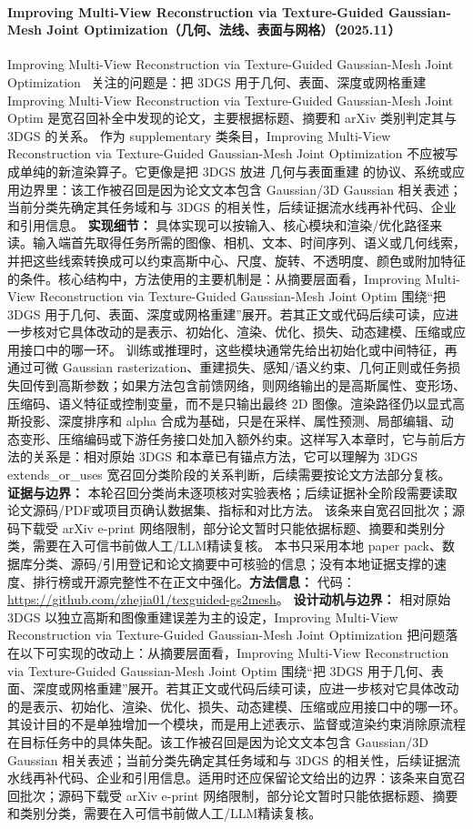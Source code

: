 \paragraph{Improving Multi-View Reconstruction via Texture-Guided Gaussian-Mesh Joint Optimization（几何、法线、表面与网格）（2025.11）}
Improving Multi-View Reconstruction via Texture-Guided Gaussian-Mesh Joint Optimization~\cite{2511_03950} 关注的问题是：把 3DGS 用于几何、表面、深度或网格重建 Improving Multi-View Reconstruction via Texture-Guided Gaussian-Mesh Joint Optim 是宽召回补全中发现的论文，主要根据标题、摘要和 arXiv 类别判定其与 3DGS 的关系。
作为 supplementary 类条目，Improving Multi-View Reconstruction via Texture-Guided Gaussian-Mesh Joint Optimization 不应被写成单纯的新渲染算子。它更像是把 3DGS 放进 几何与表面重建 的协议、系统或应用边界里：该工作被召回是因为论文文本包含 Gaussian/3D Gaussian 相关表述；当前分类先确定其任务域和与 3DGS 的相关性，后续证据流水线再补代码、企业和引用信息。
\textbf{实现细节：} 具体实现可以按输入、核心模块和渲染/优化路径来读。输入端首先取得任务所需的图像、相机、文本、时间序列、语义或几何线索，并把这些线索转换成可以约束高斯中心、尺度、旋转、不透明度、颜色或附加特征的条件。核心结构中，方法使用的主要机制是：从摘要层面看，Improving Multi-View Reconstruction via Texture-Guided Gaussian-Mesh Joint Optim 围绕“把 3DGS 用于几何、表面、深度或网格重建”展开。若其正文或代码后续可读，应进一步核对它具体改动的是表示、初始化、渲染、优化、损失、动态建模、压缩或应用接口中的哪一环。 训练或推理时，这些模块通常先给出初始化或中间特征，再通过可微 Gaussian rasterization、重建损失、感知/语义约束、几何正则或任务损失回传到高斯参数；如果方法包含前馈网络，则网络输出的是高斯属性、变形场、压缩码、语义特征或控制变量，而不是只输出最终 2D 图像。渲染路径仍以显式高斯投影、深度排序和 alpha 合成为基础，只是在采样、属性预测、局部编辑、动态变形、压缩编码或下游任务接口处加入额外约束。这样写入本章时，它与前后方法的关系是：相对原始 3DGS 和本章已有锚点方法，它可以理解为 3DGS extends\_or\_uses 宽召回分类阶段的关系判断，后续需要按论文方法部分复核。
\textbf{证据与边界：} 本轮召回分类尚未逐项核对实验表格；后续证据补全阶段需要读取论文源码/PDF或项目页确认数据集、指标和对比方法。 该条来自宽召回批次；源码下载受 arXiv e-print 网络限制，部分论文暂时只能依据标题、摘要和类别分类，需要在入可信书前做人工/LLM精读复核。 本书只采用本地 paper pack、数据库分类、源码/引用登记和论文摘要中可核验的信息；没有本地证据支撑的速度、排行榜或开源完整性不在正文中强化。\textbf{方法信息：} 代码：\url{https://github.com/zhejia01/texguided-gs2mesh}。
\textbf{设计动机与边界：} 相对原始 3DGS 以独立高斯和图像重建误差为主的设定，Improving Multi-View Reconstruction via Texture-Guided Gaussian-Mesh Joint Optimization 把问题落在以下可实现的改动上：从摘要层面看，Improving Multi-View Reconstruction via Texture-Guided Gaussian-Mesh Joint Optim 围绕“把 3DGS 用于几何、表面、深度或网格重建”展开。若其正文或代码后续可读，应进一步核对它具体改动的是表示、初始化、渲染、优化、损失、动态建模、压缩或应用接口中的哪一环。其设计目的不是单独增加一个模块，而是用上述表示、监督或渲染约束消除原流程在目标任务中的具体失配。该工作被召回是因为论文文本包含 Gaussian/3D Gaussian 相关表述；当前分类先确定其任务域和与 3DGS 的相关性，后续证据流水线再补代码、企业和引用信息。适用时还应保留论文给出的边界：该条来自宽召回批次；源码下载受 arXiv e-print 网络限制，部分论文暂时只能依据标题、摘要和类别分类，需要在入可信书前做人工/LLM精读复核。
